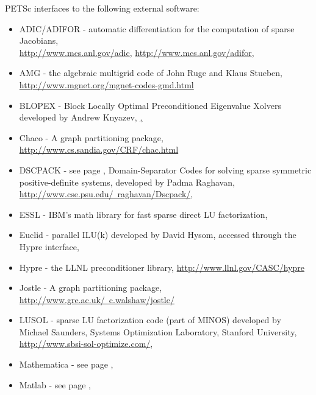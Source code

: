 \vspace{.3in}
\noindent
PETSc interfaces to the following external software:
\begin{itemize}
  \item ADIC/ADIFOR -  automatic differentiation for the computation of sparse Jacobians,\\ 
                     \href{http://www.mcs.anl.gov/adic}{http://www.mcs.anl.gov/adic},
                     \href{http://www.mcs.anl.gov/adifor}{http://www.mcs.anl.gov/adifor},
  \item AMG -         the algebraic multigrid code of John Ruge and Klaus Stueben,
                     \href{http://www.mgnet.org/mgnet-codes-gmd.html}{http://www.mgnet.org/mgnet-codes-gmd.html}
  \item BLOPEX - Block Locally Optimal Preconditioned Eigenvalue Xolvers developed by Andrew Knyazev,
                    \href{http://www-math.cudenver.edu/~aknyazev/software/BLOPEX/},
  \item Chaco -     A graph partitioning package, \href{ http://www.cs.sandia.gov/CRF/chac.html}{ http://www.cs.sandia.gov/CRF/chac.html}
  \item DSCPACK -    see page \pageref{sec_externalsol}, Domain-Separator Codes for solving sparse symmetric
                      positive-definite systems, 
                     developed by Padma Raghavan,   
                     \href{http://www.cse.psu.edu/~raghavan/Dscpack/}{http://www.cse.psu.edu/~raghavan/Dscpack/},
  \item ESSL -         IBM's math library for fast sparse direct LU factorization,
  \item Euclid  -   parallel ILU(k) developed by David Hysom, accessed through the Hypre interface,
  \item Hypre -    the LLNL preconditioner library, \href{http://www.llnl.gov/CASC/hypre}{http://www.llnl.gov/CASC/hypre}
  \item Jostle -     A graph partitioning package, \href{http://www.gre.ac.uk/~c.walshaw/jostle/}{http://www.gre.ac.uk/~c.walshaw/jostle/}
  \item LUSOL -       sparse LU factorization code (part of MINOS) developed by Michael Saunders,
                      Systems Optimization Laboratory, Stanford University,
                     \href{http://www.sbsi-sol-optimize.com/}{http://www.sbsi-sol-optimize.com/},
  \item Mathematica -  see page \pageref{ch_mathematica},
  \item Matlab -      see page \pageref{ch_matlab},

\end{itemize}
